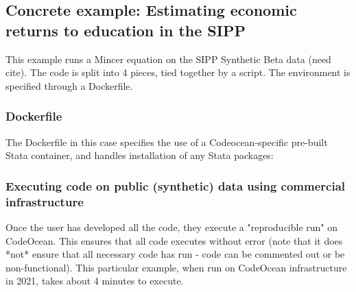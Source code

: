 \documentclass{article}
\begin{document}
\subsection{Concrete example: Estimating economic returns to education in the SIPP}

This example runs a Mincer equation on the SIPP Synthetic Beta data (need cite). The code is split into 4 pieces, tied together by a script. The environment is specified through a Dockerfile. 







\subsubsection{Dockerfile}

The Dockerfile in this case specifies the use of a Codeocean-specific pre-built Stata container, and handles installation of any Stata packages:



\subsubsection{Executing code on public (synthetic) data using commercial infrastructure}

Once the user has developed all the code, they execute a "reproducible run" on CodeOcean. This ensures that all code executes without error (note that it does *not* ensure that all necessary code has run - code can be commented out or be non-functional). This particular example, when run on CodeOcean infrastructure in 2021, takes about 4 minutes to execute.
\end{document}
